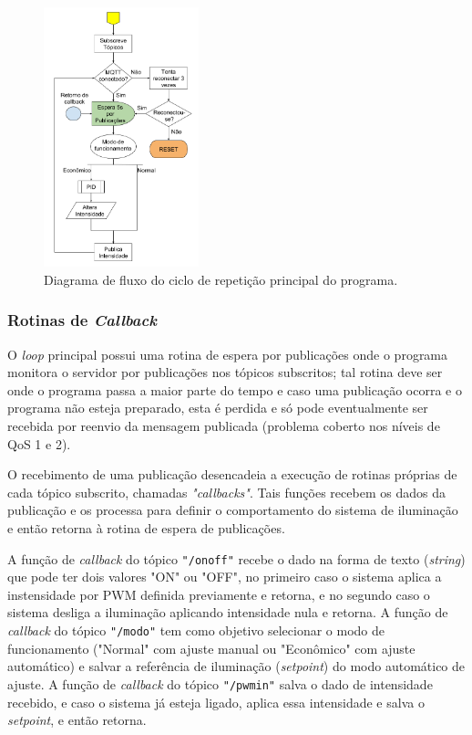 \begin{figure}[ht]
    \begin{center}
    \includegraphics[width=0.4\textwidth]{figuras/flux_loop.png}
    \end{center}
    \caption[Diagrama de fluxo do ciclo de repetição principal do programa.]{Diagrama de fluxo do ciclo de repetição principal do programa.}
    \label{floop}
\end{figure}

\subsubsection{Rotinas de \textit{Callback}}

O \textit{loop} principal possui uma rotina de espera por publicações onde o programa monitora o servidor por publicações nos tópicos subscritos; tal rotina deve ser onde o programa passa a maior parte do tempo e caso uma publicação ocorra e o programa não esteja preparado, esta é perdida e só pode eventualmente ser recebida por reenvio da mensagem publicada (problema coberto nos níveis de QoS 1 e 2).

O recebimento de uma publicação desencadeia a execução de rotinas próprias de cada tópico subscrito, chamadas \textit{"callbacks"}. Tais funções recebem os dados da publicação e os processa para definir o comportamento do sistema de iluminação e então retorna à rotina de espera de publicações.

A função de \textit{callback} do tópico \texttt{"/onoff"} recebe o dado na forma de texto (\textit{string}) que pode ter dois valores "ON" ou "OFF", no primeiro caso o sistema aplica a instensidade por PWM definida previamente e retorna, e no segundo caso o sistema desliga a iluminação aplicando intensidade nula e retorna. A função de \textit{callback} do tópico \texttt{"/modo"} tem como objetivo selecionar o modo de funcionamento ("Normal" com ajuste manual ou "Econômico" com ajuste automático) e salvar a referência de iluminação (\textit{setpoint}) do modo automático de ajuste. A função de \textit{callback} do tópico \texttt{"/pwmin"} salva o dado de intensidade recebido, e caso o sistema já esteja ligado, aplica essa intensidade e salva o \textit{setpoint}, e então retorna.

